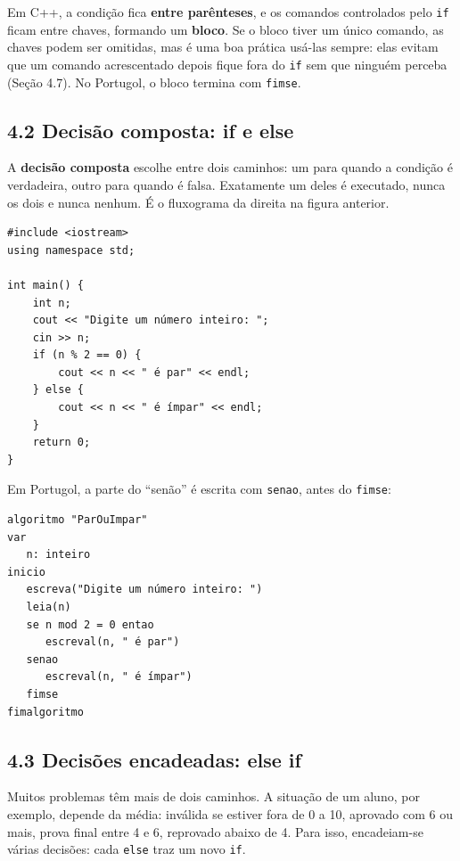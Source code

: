 Em C++, a condição fica \textbf{entre parênteses}, e os comandos controlados pelo \texttt{if} ficam entre chaves, formando um \textbf{bloco}. Se o bloco tiver um único comando, as chaves podem ser omitidas, mas é uma boa prática usá-las sempre: elas evitam que um comando acrescentado depois fique fora do \texttt{if} sem que ninguém perceba (Seção 4.7). No Portugol, o bloco termina com \texttt{fimse}.

\subsection{4.2 Decisão composta: if e else}

A \textbf{decisão composta} escolhe entre dois caminhos: um para quando a condição é verdadeira, outro para quando é falsa. Exatamente um deles é executado, nunca os dois e nunca nenhum. É o fluxograma da direita na figura anterior.

\begin{codigo}
\begin{Verbatim}[breaklines=true, breaksymbolleft={}, fontsize=\footnotesize]
#include <iostream>
using namespace std;

int main() {
    int n;
    cout << "Digite um número inteiro: ";
    cin >> n;
    if (n % 2 == 0) {
        cout << n << " é par" << endl;
    } else {
        cout << n << " é ímpar" << endl;
    }
    return 0;
}
\end{Verbatim}
\end{codigo}

Em Portugol, a parte do ``senão'' é escrita com \texttt{senao}, antes do \texttt{fimse}:

\begin{codigo}
\begin{Verbatim}[breaklines=true, breaksymbolleft={}, fontsize=\footnotesize]
algoritmo "ParOuImpar"
var
   n: inteiro
inicio
   escreva("Digite um número inteiro: ")
   leia(n)
   se n mod 2 = 0 entao
      escreval(n, " é par")
   senao
      escreval(n, " é ímpar")
   fimse
fimalgoritmo
\end{Verbatim}
\end{codigo}

\subsection{4.3 Decisões encadeadas: else if}

Muitos problemas têm mais de dois caminhos. A situação de um aluno, por exemplo, depende da média: inválida se estiver fora de 0 a 10, aprovado com 6 ou mais, prova final entre 4 e 6, reprovado abaixo de 4. Para isso, encadeiam-se várias decisões: cada \texttt{else} traz um novo \texttt{if}.

